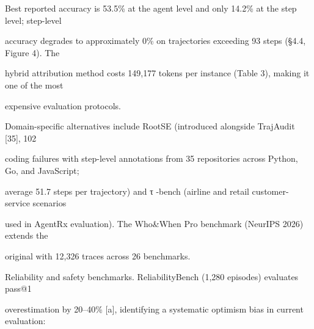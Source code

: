 \begin{flushleft}
\noindent Best reported accuracy is 53.5\% at the agent level and only 14.2\% at the step level; step-level\par
\noindent accuracy degrades to approximately 0\% on trajectories exceeding 93 steps (§4.4, Figure 4). The\par
\noindent hybrid attribution method costs 149,177 tokens per instance (Table 3), making it one of the most\par
\noindent expensive evaluation protocols.\par
\noindent  Domain-specific alternatives include RootSE (introduced alongside TrajAudit [35], 102\par
\noindent coding failures with step-level annotations from 35 repositories across Python, Go, and JavaScript;\par
\noindent average 51.7 steps per trajectory) and τ -bench (airline and retail customer-service scenarios\par
\noindent used in AgentRx evaluation). The Who\&When Pro benchmark (NeurIPS 2026) extends the\par
\noindent original with 12,326 traces across 26 benchmarks.\par
\par\smallskip
\noindent Reliability and safety benchmarks. ReliabilityBench (1,280 episodes) evaluates pass@1\par
\noindent overestimation by 20–40\% [a], identifying a systematic optimism bias in current evaluation:\par
\end{flushleft}
